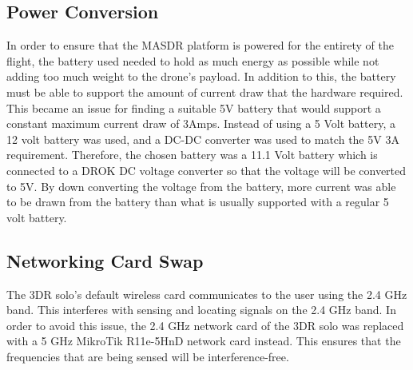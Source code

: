 \subsection{Power Conversion}
In order to ensure that the MASDR platform is powered for the entirety of the flight, the battery used needed to hold as much energy as possible while not adding too much weight to the drone’s payload. In addition to this, the battery must be able to support the amount of current draw that the hardware required. This became an issue for finding a suitable 5V battery that would support a constant maximum current draw of 3Amps. Instead of using a 5 Volt battery, a 12 volt battery was used, and a DC-DC converter was used to match the 5V 3A requirement. Therefore, the chosen battery was a 11.1 Volt battery which is connected to a DROK DC voltage converter so that the voltage will be converted to 5V. By down converting the voltage from the battery, more current was able to be drawn from the battery than what is usually supported with a regular 5 volt battery.
\subsection{Networking Card Swap}
The 3DR solo’s default wireless card communicates to the user using the 2.4 GHz band. This interferes with sensing and locating signals on the 2.4 GHz band. In order to avoid this issue, the 2.4 GHz network card of the 3DR solo was replaced with a 5 GHz MikroTik R11e-5HnD network card instead. This ensures that the frequencies that are being sensed will be interference-free.
